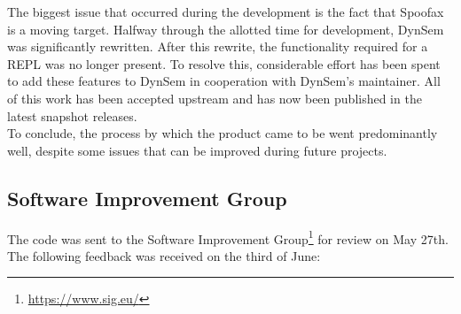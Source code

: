 The biggest issue that occurred during the development is the fact that Spoofax
is a moving target. Halfway through the allotted time for development, DynSem
was significantly rewritten. After this rewrite, the functionality required for
a REPL was no longer present. To resolve this, considerable effort has been spent
to add these features to DynSem in cooperation with DynSem's maintainer. All of
this work has been accepted upstream and has now been published in the latest
snapshot releases.\\

To conclude, the process by which the product came to be went predominantly
well, despite some issues that can be improved during future projects.

\subsection{Software Improvement Group}
\label{ssec:sig}

The code was sent to the Software Improvement
Group\footnote{\url{https://www.sig.eu/}} for review on May 27th. The following
feedback was received on the third of June:

